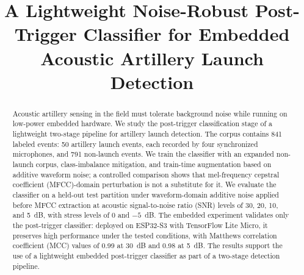 ﻿\documentclass[conference]{IEEEtran}
\begin{document}
\title{A Lightweight Noise-Robust Post-Trigger Classifier for Embedded Acoustic Artillery Launch Detection}

\author{
\and
{}
\and
{}
}

\maketitle

\begin{abstract}
Acoustic artillery sensing in the field must tolerate background noise while running on low-power embedded hardware. We study the post-trigger classification stage of a lightweight two-stage pipeline for artillery launch detection. The corpus contains 841 labeled events: 50 artillery launch events, each recorded by four synchronized microphones, and 791 non-launch events. We train the classifier with an expanded non-launch corpus, class-imbalance mitigation, and train-time augmentation based on additive waveform noise; a controlled comparison shows that mel-frequency cepstral coefficient (MFCC)-domain perturbation is not a substitute for it. We evaluate the classifier on a held-out test partition under waveform-domain additive noise applied before MFCC extraction at acoustic signal-to-noise ratio (SNR) levels of 30, 20, 10, and 5~dB, with stress levels of 0 and $-5$~dB. The embedded experiment validates only the post-trigger classifier: deployed on ESP32-S3 with TensorFlow Lite Micro, it preserves high performance under the tested conditions, with Matthews correlation coefficient (MCC) values of 0.99 at 30~dB and 0.98 at 5~dB. The results support the use of a lightweight embedded post-trigger classifier as part of a two-stage detection pipeline.
\end{abstract}
\end{document}
